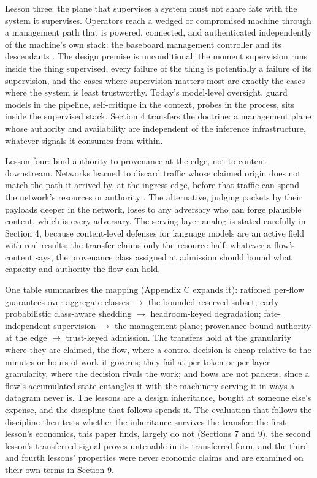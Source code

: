 Lesson three: the plane that supervises a system must not share fate with
the system it supervises. Operators reach a wedged or compromised machine
through a management path that is powered, connected, and authenticated
independently of the machine's own stack: the baseboard management
controller and its descendants \citep{ipmi_spec}. The design premise is
unconditional: the moment supervision runs inside the thing supervised,
every failure of the thing is potentially a failure of its supervision,
and the cases where supervision matters most are exactly the cases where
the system is least trustworthy. Today's model-level oversight, guard
models in the pipeline, self-critique in the context, probes in the
process, sits inside the supervised stack. Section 4 transfers the
doctrine: a management plane whose authority and availability are
independent of the inference infrastructure, whatever signals it consumes
from within.

Lesson four: bind authority to provenance at the edge, not to content
downstream. Networks learned to discard traffic whose claimed origin does
not match the path it arrived by, at the ingress edge, before that
traffic can spend the network's resources or authority \citep{rfc2827,rfc3704}. The alternative, judging packets by their payloads deeper in
the network, loses to any adversary who can forge plausible content,
which is every adversary. The serving-layer analog is stated carefully in
Section 4, because content-level defenses for language models are an
active field with real results; the transfer claims only the resource
half: whatever a flow's content says, the provenance class assigned at
admission should bound what capacity and authority the flow can hold.

One table summarizes the mapping (Appendix C expands it): rationed
per-flow guarantees over aggregate classes $\to$ the bounded reserved subset;
early probabilistic class-aware shedding $\to$ headroom-keyed degradation;
fate-independent supervision $\to$ the management plane; provenance-bound
authority at the edge $\to$ trust-keyed admission. The transfers hold at the
granularity where they are claimed, the flow, where a control decision is
cheap relative to the minutes or hours of work it governs; they fail at
per-token or per-layer granularity, where the decision rivals the work;
and flows are not packets, since a flow's accumulated state entangles it
with the machinery serving it in ways a datagram never is. The lessons
are a design inheritance, bought at someone else's expense, and the
discipline that follows spends it. The evaluation that follows the
discipline then tests whether the inheritance survives the transfer: the
first lesson's economics, this paper finds, largely do not (Sections 7
and 9), the second lesson's transferred signal proves untenable in its
transferred form, and the third and fourth lessons' properties were never
economic claims and are examined on their own terms in Section 9.
